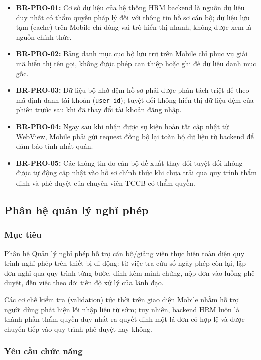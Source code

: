 \begin{itemize}[leftmargin=1.5cm]
    \item \textbf{BR-PRO-01:} Cơ sở dữ liệu của hệ thống HRM backend là nguồn dữ liệu duy nhất có thẩm quyền pháp lý đối với thông tin hồ sơ cán bộ; dữ liệu lưu tạm (cache) trên Mobile chỉ đóng vai trò hiển thị nhanh, không được xem là nguồn chính thức.
    \item \textbf{BR-PRO-02:} Bảng danh mục cục bộ lưu trữ trên Mobile chỉ phục vụ giải mã hiển thị tên gọi, không được phép can thiệp hoặc ghi đè dữ liệu danh mục gốc.
    \item \textbf{BR-PRO-03:} Dữ liệu bộ nhớ đệm hồ sơ phải được phân tách triệt để theo mã định danh tài khoản (\texttt{user\_id}); tuyệt đối không hiển thị dữ liệu đệm của phiên trước sau khi đã thay đổi tài khoản đăng nhập.
    \item \textbf{BR-PRO-04:} Ngay sau khi nhận được sự kiện hoàn tất cập nhật từ WebView, Mobile phải gửi request đồng bộ lại toàn bộ dữ liệu từ backend để đảm bảo tính nhất quán.
    \item \textbf{BR-PRO-05:} Các thông tin do cán bộ đề xuất thay đổi tuyệt đối không được tự động cập nhật vào hồ sơ chính thức khi chưa trải qua quy trình thẩm định và phê duyệt của chuyên viên TCCB có thẩm quyền.
\end{itemize}

\subsection{Phân hệ quản lý nghỉ phép}
\label{subsec:req_leave}

\subsubsection{Mục tiêu}
Phân hệ Quản lý nghỉ phép hỗ trợ cán bộ/giảng viên thực hiện toàn diện quy trình nghỉ phép trên thiết bị di động: từ việc tra cứu số ngày phép còn lại, lập đơn nghỉ qua quy trình từng bước, đính kèm minh chứng, nộp đơn vào luồng phê duyệt, đến việc theo dõi tiến độ xử lý của lãnh đạo.

Các cơ chế kiểm tra (validation) tức thời trên giao diện Mobile nhằm hỗ trợ người dùng phát hiện lỗi nhập liệu từ sớm; tuy nhiên, backend HRM luôn là thành phần thẩm quyền duy nhất ra quyết định một lá đơn có hợp lệ và được chuyển tiếp vào quy trình phê duyệt hay không.

\subsubsection{Yêu cầu chức năng}

